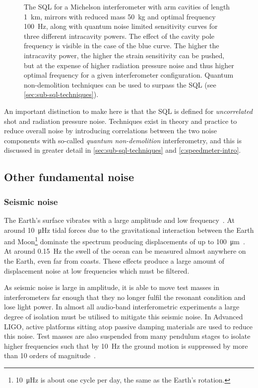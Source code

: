 \begin{figure}
  \centering
  
  \caption[Standard quantum limit and quantum noise with various input powers]{\label{fig:sql-vs-input-power}The \gls{SQL} for a Michelson interferometer with arm cavities of length \SI{1}{\kilo\meter}, mirrors with reduced mass \SI{50}{\kilo\gram} and optimal frequency \SI{100}{\hertz}, along with quantum noise limited sensitivity curves for three different intracavity powers. The effect of the cavity pole frequency is visible in the case of the blue curve. The higher the intracavity power, the higher the strain sensitivity can be pushed, but at the expense of higher radiation pressure noise and thus higher optimal frequency for a given interferometer configuration. Quantum non-demolition techniques can be used to surpass the \gls{SQL} (see \cref{sec:sub-sql-techniques}).}
\end{figure}

An important distinction to make here is that the \gls{SQL} is defined for \emph{uncorrelated} shot and radiation pressure noise. Techniques exist in theory and practice to reduce overall noise by introducing correlations between the two noise components with so-called \emph{quantum non-demolition} interferometry, and this is discussed in greater detail in \cref{sec:sub-sql-techniques} and \cref{c:speedmeter-intro}.

\subsection{Other fundamental noise}

\subsubsection{\label{sec:seismic-noise}Seismic noise}
The Earth's surface vibrates with a large amplitude and low frequency~\cite{ET2011}. At around \SI{10}{\micro\hertz} tidal forces due to the gravitational interaction between the Earth and Moon\footnote{\SI{10}{\micro\hertz} is about one cycle per day, the same as the Earth's rotation.} dominate the spectrum producing displacements of up to \SI{100}{\micro\meter}~\cite{Adhikari2004}. At around \SI{0.15}{\hertz} the swell of the ocean can be measured almost anywhere on the Earth, even far from coasts. These effects produce a large amount of displacement noise at low frequencies which must be filtered.

As seismic noise is large in amplitude, it is able to move test masses in interferometers far enough that they no longer fulfil the resonant condition and lose light power. In almost all audio-band interferometric experiments a large degree of isolation must be utilised to mitigate this seismic noise. In Advanced \gls{LIGO}, active platforms sitting atop passive damping materials are used to reduce this noise. Test masses are also suspended from many pendulum stages to isolate higher frequencies such that by \SI{10}{\hertz} the ground motion is suppressed by more than \num{10} orders of magnitude~\cite{Aston2012}.

